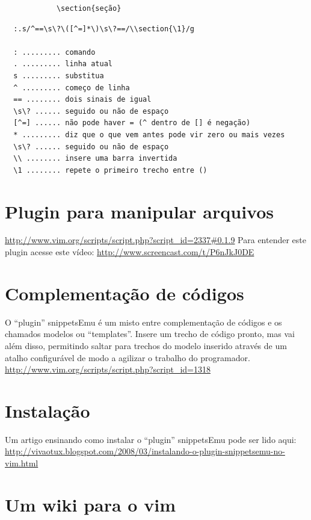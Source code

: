 \documentclass[10pt,a4paper,openany]{book}
\begin{document}
\begin{verbatim}
			\section{seção}
\end{verbatim}

\begin{verbatim}
  :.s/^==\s\?\([^=]*\)\s\?==/\\section{\1}/g

  : ......... comando
  . ......... linha atual
  s ......... substitua
  ^ ......... começo de linha
  == ........ dois sinais de igual
  \s\? ...... seguido ou não de espaço
  [^=] ...... não pode haver = (^ dentro de [] é negação)
  * ......... diz que o que vem antes pode vir zero ou mais vezes
  \s\? ...... seguido ou não de espaço
  \\ ........ insere uma barra invertida
  \1 ........ repete o primeiro trecho entre ()
\end{verbatim}

\section{Plugin para manipular arquivos}
\url{http://www.vim.org/scripts/script.php?script_id=2337#0.1.9}
Para entender este plugin acesse este vídeo:
 \url{http://www.screencast.com/t/P6nJkJ0DE}


\section{Complementação de códigos}
\label{Complementação de códigos}

O ``plugin'' snippetsEmu é um misto entre complementação de códigos e
os chamados modelos ou ``templates''. Insere um trecho de código pronto,
mas vai além disso, permitindo saltar para trechos do modelo inserido
através de um atalho configurável de modo a agilizar o trabalho do
programador. \url{http://www.vim.org/scripts/script.php?script\_id=1318}

\section{Instalação}
\label{Instalação}

Um artigo ensinando como instalar o ``plugin'' snippetsEmu pode ser lido aqui:
 \url{http://vivaotux.blogspot.com/2008/03/instalando-o-plugin-snippetsemu-no-vim.html}

\section{Um wiki para o vim}
\label{Um wiki para o vim}
\end{document}
